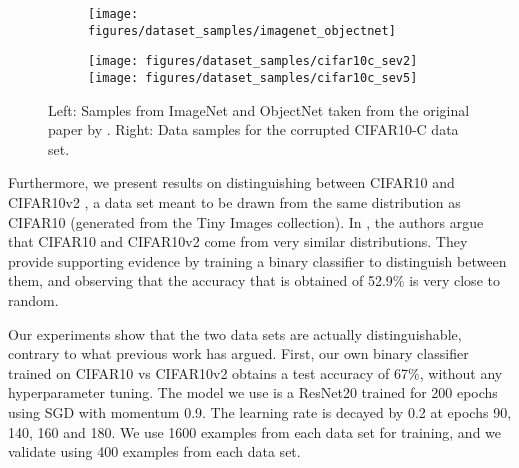 \begin{figure*}[h]
\vspace{-0.2cm}
  \centering
  \hspace*{\fill}\begin{subfigure}[r]{0.49\textwidth}
  \centering
  \texttt{[image: figures/dataset\_samples/imagenet\_objectnet]}

\end{subfigure}
\hfill
\begin{subfigure}[c]{0.5\textwidth}
  \centering
  \texttt{[image: figures/dataset\_samples/cifar10c\_sev2]}
  \texttt{[image: figures/dataset\_samples/cifar10c\_sev5]}
\end{subfigure}

  \caption{Left: Samples from ImageNet and ObjectNet taken from the original
  paper by \citep{Barbu2019}. Right: Data samples for the corrupted CIFAR10-C
data set.}

  \label{fig:data_samples_cifar_and_objectnet}
\end{figure*}


Furthermore, we present results on distinguishing between CIFAR10 \citep{cifar}
and CIFAR10v2 \citep{recht}, a data set meant to be drawn from the same
distribution as CIFAR10 (generated from the Tiny Images collection).  In \citet{recht}, the authors argue
that CIFAR10 and CIFAR10v2 come from very similar distributions. They provide
supporting evidence by training a binary classifier to distinguish between them,
and observing that the accuracy that is obtained of 52.9\% is very close to
random.

Our experiments show that the two data sets are actually distinguishable,
contrary to what previous work has argued. First, our own binary classifier
trained on CIFAR10 vs CIFAR10v2 obtains a test accuracy of 67\%, without any
hyperparameter tuning. The model we use is a ResNet20 trained for 200 epochs
using SGD with momentum 0.9. The learning rate is decayed by 0.2 at epochs 90,
140, 160 and 180. We use 1600 examples from each data set for training, and we
validate using 400 examples from each data set.

